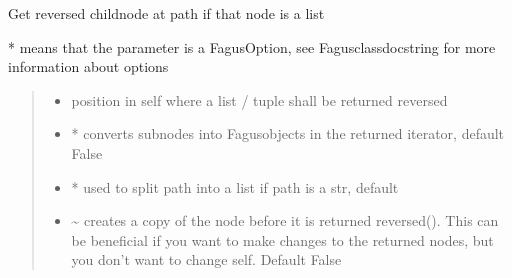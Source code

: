 \documentclass[a4paper,10pt,english]{sphinxmanual}
\begin{document}
\begin{fulllineitems}
\begin{fulllineitems}
\end{fulllineitems}


\begin{fulllineitems}
\label{\detokenize{fagus:fagus.Fagus.reversed}}
\pysigstartsignatures
{}
\pysigstopsignatures
\sphinxAtStartPar
Get reversed child\sphinxhyphen{}node at path if that node is a list

\sphinxAtStartPar
* means that the parameter is a FagusOption, see Fagus\sphinxhyphen{}class\sphinxhyphen{}docstring for more information about options
\begin{quote}\begin{description}
\begin{itemize}
\item {}
\sphinxAtStartPar
{} \textendash{} position in self where a list / tuple shall be returned reversed

\item {}
\sphinxAtStartPar
{} \textendash{} * converts sub\sphinxhyphen{}nodes into Fagus\sphinxhyphen{}objects in the returned iterator, default False

\item {}
\sphinxAtStartPar
{} \textendash{} * used to split path into a list if path is a str, default 

\item {}
\sphinxAtStartPar
{} \textendash{} \textasciitilde{} creates a copy of the node before it is returned reversed(). This can be beneficial if you want to
make changes to the returned nodes, but you don’t want to change self. Default False


\end{itemize}
\end{description}
\end{quote}
\end{fulllineitems}
\end{fulllineitems}
\end{document}
